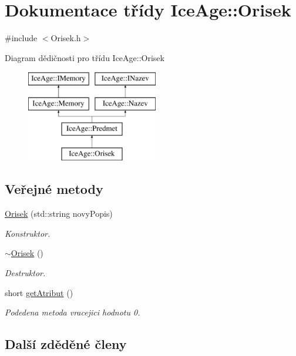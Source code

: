 \hypertarget{classIceAge_1_1Orisek}{}\section{Dokumentace třídy Ice\+Age\+:\+:Orisek}
\label{classIceAge_1_1Orisek}


{\ttfamily \#include $<$Orisek.\+h$>$}

Diagram dědičnosti pro třídu Ice\+Age\+:\+:Orisek\begin{figure}[H]
\begin{center}
\leavevmode
\includegraphics[height=4.000000cm]{d7/d11/classIceAge_1_1Orisek}
\end{center}
\end{figure}
\subsection*{Veřejné metody}
\begin{DoxyCompactItemize}
\item 
\hyperlink{classIceAge_1_1Orisek_ab01a1d98a4f04839d1110b14335f9007}{Orisek} (std\+::string novy\+Popis)
\begin{DoxyCompactList}\small\item\em Konstruktor. \end{DoxyCompactList}\item 
\hyperlink{classIceAge_1_1Orisek_a4180472fce3b7381d49244fd76954d95}{$\sim$\+Orisek} ()
\begin{DoxyCompactList}\small\item\em Destruktor. \end{DoxyCompactList}\item 
short \hyperlink{classIceAge_1_1Orisek_aee44e1de3168d98f5da635476ffd9560}{get\+Atribut} ()
\begin{DoxyCompactList}\small\item\em Podedena metoda vracejici hodnotu 0. \end{DoxyCompactList}\end{DoxyCompactItemize}
\subsection*{Další zděděné členy}


